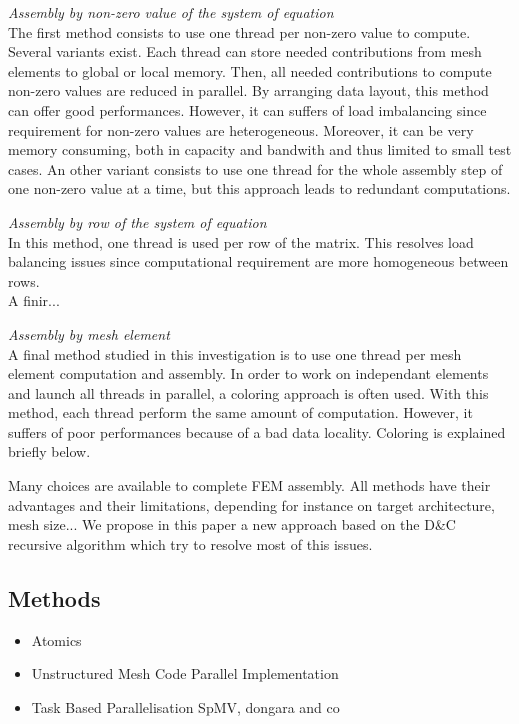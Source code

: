 \documentclass{IOS-Book-Article}
\begin{document}
\emph{Assembly by non-zero value of the system of equation}\\
The first method consists to use one thread per non-zero value to compute. Several variants exist.
Each thread can store needed contributions from mesh elements to global or local memory. Then, all needed contributions to compute non-zero values are reduced in parallel.
By arranging data layout, this method can offer good performances. However, it can suffers of load imbalancing since requirement for non-zero values are heterogeneous.
Moreover, it can be very memory consuming, both in capacity and bandwith and thus limited to small test cases.
An other variant consists to use one thread for the whole assembly step of one non-zero value at a time, but this approach leads to redundant computations.

\emph{Assembly by row of the system of equation}\\
In this method, one thread is used per row of the matrix. This resolves load balancing issues since computational requirement are more homogeneous between rows.\\
A finir...

\emph{Assembly by mesh element}\\
A final method studied in this investigation is to use one thread per mesh element computation and assembly.
In order to work on independant elements and launch all threads in parallel, a coloring approach is often used.
With this method, each thread perform the same amount of computation. However, it suffers of poor performances because of a bad data locality.
Coloring is explained briefly below.

Many choices are available to complete FEM assembly. All methods have their advantages and their limitations, depending for instance on target architecture, mesh size...
We propose in this paper a new approach based on the D\&C recursive algorithm which try to resolve most of this issues.

\subsection{Methods}
\begin{itemize}
 \item Atomics
 \item Unstructured Mesh Code Parallel Implementation
 \item Task Based Parallelisation SpMV, dongara and co \cite{MPI_task}
\end{itemize}
\end{document}

